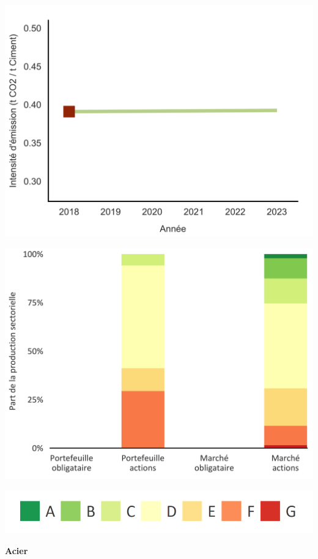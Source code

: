 \documentclass[10pt,table,a4]{article}\usepackage[]{graphicx}\usepackage[]{color}
\begin{document}
	\begin{multicols}{2}
		
		\includegraphics[width=.9\linewidth]{ReportOutputs/Fig30} \vfill\null \columnbreak
		
		\includegraphics[width=.9\linewidth]{ReportOutputs/Fig33}
		\begin{center}
			\includegraphics[width=0.6\linewidth]{ReportGraphics/ShippingLegend}
		\end{center}	
		
	\end{multicols}
	
	\begin{multicols}{2}
		\begin{center}
		\textbf{Acier}
		\end{center}
	    \begin{center}
		\end{center}
	\end{multicols}
	
\end{document}
